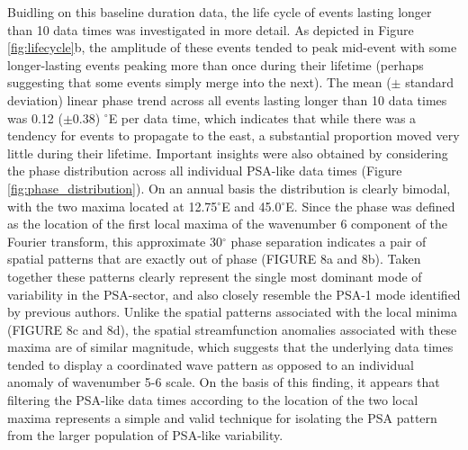 Buidling on this baseline duration data, the life cycle of events lasting longer than 10 data times was investigated in more detail. As depicted in Figure \ref{fig:lifecycle}b, the amplitude of these events tended to peak mid-event with some longer-lasting events peaking more than once during their lifetime (perhaps suggesting that some events simply merge into the next). The mean ($\pm$ standard deviation) linear phase trend across all events lasting longer than 10 data times was 0.12 ($\pm 0.38$) $^{\circ}$E per data time, which indicates that while there was a tendency for events to propagate to the east, a substantial proportion moved very little during their lifetime. Important insights were also obtained by considering the phase distribution across all individual PSA-like data times (Figure \ref{fig:phase_distribution}). On an annual basis the distribution is clearly bimodal, with the two maxima located at 12.75$^{\circ}$E and 45.0$^{\circ}$E. Since the phase was defined as the location of the first local maxima of the wavenumber 6 component of the Fourier transform, this approximate 30$^{\circ}$ phase separation indicates a pair of spatial patterns that are exactly out of phase (FIGURE 8a and 8b). Taken together these patterns clearly represent the single most dominant mode of variability in the PSA-sector, and also closely resemble the PSA-1 mode identified by previous authors. Unlike the spatial patterns associated with the local minima (FIGURE 8c and 8d), the spatial streamfunction anomalies associated with these maxima are of similar magnitude, which suggests that the underlying data times tended to display a coordinated wave pattern as opposed to an individual anomaly of wavenumber 5-6 scale. On the basis of this finding, it appears that filtering the PSA-like data times according to the location of the two local maxima represents a simple and valid technique for isolating the PSA pattern from the larger population of PSA-like variability. 


